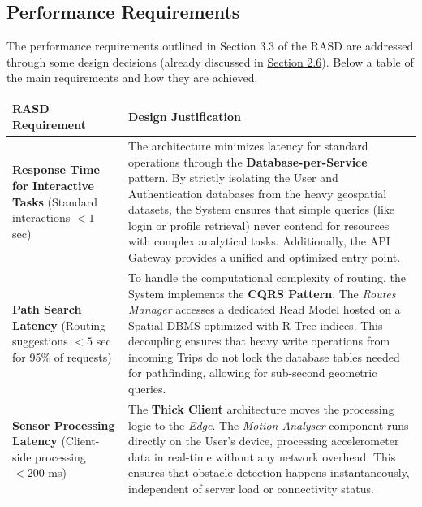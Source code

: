 \subsection{Performance Requirements}
The performance requirements outlined in Section 3.3  of the RASD are addressed through some design decisions (already discussed in \hyperref[sec:architectural_styles]{Section 2.6}). Below a table of the main requirements and how they are achieved.
\begin{table}[H]
\sf
\small
\renewcommand{\arraystretch}{1.5}
\begin{xltabular}{\textwidth}{|p{0.25\textwidth}|X|}
    \hline
     \textbf{RASD Requirement} & \textbf{Design Justification} \\
    \hline
    \endhead
    
    \textbf{Response Time for Interactive Tasks} \newline
    (Standard interactions $< 1$ sec) & 
    The architecture minimizes latency for standard operations through the \textbf{Database-per-Service} pattern. By strictly isolating the User and Authentication databases from the heavy geospatial datasets, the System ensures that simple queries (like login or profile retrieval) never contend for resources with complex analytical tasks. Additionally, the API Gateway provides a unified and optimized entry point. \\
    \hline
    
    \textbf{Path Search Latency} \newline
    (Routing suggestions $< 5$ sec for 95\% of requests) & 
    To handle the computational complexity of routing, the System implements the \textbf{CQRS Pattern}. The \emph{Routes Manager} accesses a dedicated Read Model hosted on a Spatial DBMS optimized with R-Tree indices. This decoupling ensures that heavy write operations from incoming Trips do not lock the database tables needed for pathfinding, allowing for sub-second geometric queries. \\
    \hline
    
    \textbf{Sensor Processing Latency} \newline
    (Client-side processing $< 200$ ms) & 
    The \textbf{Thick Client} architecture moves the processing logic to the \emph{Edge}. The \emph{Motion Analyser} component runs directly on the User's device, processing accelerometer data in real-time without any network overhead. This ensures that obstacle detection happens instantaneously, independent of server load or connectivity status. \\
    \hline
    

\end{xltabular}
\end{table}
